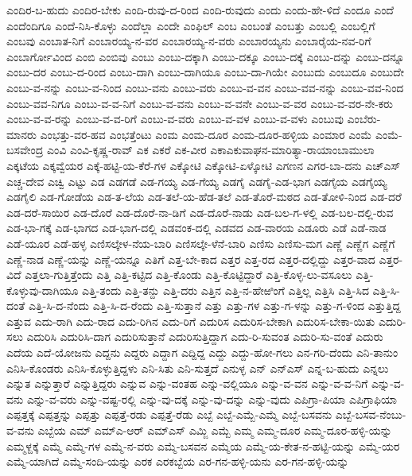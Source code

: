 ಎಂದಿರ-ಬ-ಹುದು
ಎಂದಿರ-ಬೇಕು
ಎಂದಿ-ರುವು-ದ-ರಿಂದ
ಎಂದಿ-ರುವುದು
ಎಂದು
ಎಂದು-ಹೇ-ಳಿದೆ
ಎಂದೂ
ಎಂದೆ
ಎಂದೆಂದಿಗೂ
ಎಂದೆ-ನಿಸಿ-ಕೊಳ್ಳು
ಎಂದೆಲ್ಲಾ
ಎಂದೇ
ಎಂಫಿಲ್
ಎಂಬ
ಎಂಬಂತೆ
ಎಂಬತ್ತು
ಎಂಬಲ್ಲಿ
ಎಂಬಲ್ಲಿಗೆ
ಎಂಬವು
ಎಂಬಾತ-ನಿಗೆ
ಎಂಬಾರಯ್ಯ-ನ-ವರ
ಎಂಬಾರಯ್ಯ-ನ-ವರು
ಎಂಬಾರಯ್ಯನು
ಎಂಬಾರೈಯ-ನವ-ರಿಗೆ
ಎಂಬಾರ್ಗೋವಿಂದ
ಎಂಬಿ
ಎಂಬಿವು
ಎಂಬು
ಎಂಬು-ದಕ್ಕಾಗಿ
ಎಂಬು-ದಕ್ಕೂ
ಎಂಬು-ದಕ್ಕೆ
ಎಂಬು-ದನ್ನು
ಎಂಬು-ದನ್ನೂ
ಎಂಬು-ದರ
ಎಂಬು-ದ-ರಿಂದ
ಎಂಬು-ದಾಗಿ
ಎಂಬು-ದಾಗಿಯೂ
ಎಂಬು-ದಾ-ಗಿಯೇ
ಎಂಬುದು
ಎಂಬುದೂ
ಎಂಬುದೇ
ಎಂಬು-ವ-ನನ್ನು
ಎಂಬು-ವ-ನಿಂದ
ಎಂಬು-ವನು
ಎಂಬು-ವರು
ಎಂಬು-ವ-ವನ
ಎಂಬು-ವವ-ನನ್ನು
ಎಂಬು-ವವ-ನಿಂದ
ಎಂಬು-ವವ-ನಿಗೂ
ಎಂಬು-ವ-ವ-ನಿಗೆ
ಎಂಬು-ವ-ವನು
ಎಂಬು-ವ-ವನೇ
ಎಂಬು-ವ-ವರ
ಎಂಬು-ವ-ವರ-ನೇ-ಕರು
ಎಂಬು-ವ-ವ-ರನ್ನು
ಎಂಬು-ವ-ವ-ರಿಗೆ
ಎಂಬು-ವ-ವರು
ಎಂಬು-ವ-ವಳ
ಎಂಬು-ವ-ವಳು
ಎಂಬುವು
ಎಂಬೆರು-ಮಾನರು
ಎಂಭತ್ತು-ವರ-ಹವ
ಎಂಭತ್ತೆಂಟು
ಎಂಮ
ಎಂಮ-ದೂರ
ಎಂಮ-ದೂರ-ಹಳ್ಳಿಯ
ಎಂಮಾರ
ಎಂಮೆ
ಎಂಮೆ-ಬಸವೇಂದ್ರ
ಎಂವಿ
ಎಂವಿ-ಕೃಷ್ಣ-ರಾವ್
ಎಕ
ಎಕರೆ
ಎಕ-ವೀರ
ಎಕಾಎಕುವಾಘನ-ಮಾರಿತ್ಯಾ-ರಾಯಾಂಬಾಮುಲಾ
ಎಕ್ಕಟೆಯ
ಎಕ್ಕವ್ವೆಯರ
ಎಕ್ಕೆ-ಹಟ್ಟಿ-ಯ-ಕೆರೆ-ಗಳ
ಎಕ್ಕೋಟಿ
ಎಕ್ಕೋಟಿ-ಏಳ್ಕೋಟಿ
ಎಗಣನ
ಎಗರ-ಬಾ-ದನು
ಎಚ್ಎಸ್
ಎಚ್ಚ-ದೇವ
ಎಚ್ವಿ
ಎಟ್ಟು
ಎಡ
ಎಡಗಡೆ
ಎಡ-ಗಯ್ಯ
ಎಡ-ಗೆಯ್ಯ
ಎಡಗೈ
ಎಡಗೈ-ಎಡ-ಭಾಗ
ಎಡಗೈಯ
ಎಡಗೈಯ್ಯ
ಎಡಗೈಲಿ
ಎಡ-ಗೋಡೆಯ
ಎಡ-ತ-ಲೆಯ
ಎಡ-ತಲೆ-ಯ-ಹೆಡ-ತಲೆ
ಎಡ-ತೊರೆ-ಮಠದ
ಎಡ-ತೋಳಿ-ನಿಂದ
ಎಡ-ದರೆ
ಎಡ-ದರೆ-ಸಾಯಿರ
ಎಡ-ದೊರೆ
ಎಡ-ದೊರೆ-ನಾ-ಡಿಗೆ
ಎಡ-ದೊರೆ-ನಾಡು
ಎಡ-ಬಲ-ಗ-ಳಲ್ಲಿ
ಎಡ-ಬಲ-ದಲ್ಲಿ-ರುವ
ಎಡ-ಭಾ-ಗಕ್ಕೆ
ಎಡ-ಭಾಗದ
ಎಡ-ಭಾಗ-ದಲ್ಲಿ
ಎಡವಂಕ-ದಲ್ಲಿ
ಎಡವದ
ಎಡ-ವಾರಯ
ಎಡೂರು
ಎಡೆ
ಎಡೆ-ನಾಡ
ಎಡೆ-ಯೂರ
ಎಡೆ-ಹಳ್ಳ
ಎಣಿಸಲ್ಕೇಳ-ನೆಯ-ಬಾರಿ
ಎಣಿಸಲ್ಕೇ-ಳೆನೆ-ಬಾರಿ
ಎಣಿಸು
ಎಣಿಸು-ಮಗ
ಎಣ್ಣೆ
ಎಣ್ಣೆಗ
ಎಣ್ಣೆಗೆ
ಎಣ್ಣೆ-ನಾಡ
ಎಣ್ಣೆ-ಯನ್ನು
ಎಣ್ಣೆ-ಯನ್ನೂ
ಎತಿಗೆ
ಎತ್ತ-ಬೇ-ಕಾದ
ಎತ್ತರ
ಎತ್ತ-ರದ
ಎತ್ತರ-ದಲ್ಲಿದ್ದು
ಎತ್ತರ-ವಾದ
ಎತ್ತರ-ವಿದೆ
ಎತ್ತಲಾ-ಗುತ್ತಿತ್ತೆಂದು
ಎತ್ತಿ
ಎತ್ತಿ-ಕಟ್ಟಿದ
ಎತ್ತಿ-ಕೊಂಡು
ಎತ್ತಿ-ಕೊಟ್ಟಿದ್ದಾರೆ
ಎತ್ತಿ-ಕೊಳ್ಳ-ಲು-ವಸೂಲು
ಎತ್ತಿ-ಕೊಳ್ಳುವು-ದಾಗಿಯೂ
ಎತ್ತಿ-ತಂದು
ಎತ್ತಿ-ತನ್ದು
ಎತ್ತಿ-ದರು
ಎತ್ತಿನ
ಎತ್ತಿ-ನ-ಹೇಱಿಂಗೆ
ಎತ್ತಿಲ್ಲ
ಎತ್ತಿಸಿ
ಎತ್ತಿ-ಸಿದ
ಎತ್ತಿ-ಸಿ-ದಂತೆ
ಎತ್ತಿ-ಸಿ-ದ-ನೆಂದು
ಎತ್ತಿ-ಸಿ-ದ-ರೆಂದು
ಎತ್ತಿ-ಸುತ್ತಾನೆ
ಎತ್ತು
ಎತ್ತು-ಗಳ
ಎತ್ತು-ಗ-ಳನ್ನು
ಎತ್ತು-ಗ-ಳಿಂದ
ಎತ್ತುತ್ತಿದ್ದ
ಎತ್ತುವ
ಎದು-ರಾಗಿ
ಎದು-ರಾದ
ಎದು-ರಿಗಿನ
ಎದು-ರಿಗೆ
ಎದುರಿಸ
ಎದುರಿಸ-ಬೇಕಾಗಿ
ಎದುರಿಸ-ಬೇಕಾ-ಯಿತು
ಎದುರಿ-ಸಲು
ಎದುರಿಸಿ
ಎದುರಿಸಿ-ದಾಗ
ಎದುರಿಸುತ್ತಾನೆ
ಎದುರಿಸುತ್ತಿದ್ದಾಗ
ಎದು-ರಿ-ಸುವಂತ
ಎದುರಿ-ಸು-ವಂತೆ
ಎದುರು
ಎದೆಯ
ಎದೆ-ಯೋಜನು
ಎದ್ದನು
ಎದ್ದರು
ಎದ್ದಾಗ
ಎದ್ದಿದ್ದ
ಎದ್ದು
ಎದ್ದು-ಹೋ-ಗಲು
ಎನ-ಗರಿ-ದೆಂದು
ಎನಿ-ತಾನುಂ
ಎನಿಸಿ-ಕೊಂಡರು
ಎನಿಸಿ-ಕೊಳ್ಳುತ್ತಿದ್ದಳು
ಎನಿ-ಸಿತು
ಎನಿ-ಸುತ್ತದೆ
ಎನುಳ್ಳ
ಎನ್
ಎನ್ಎಸ್
ಎನ್ನ-ಬ-ಹುದು
ಎನ್ನಲು
ಎನ್ನುತ
ಎನ್ನುತ್ತಾರೆ
ಎನ್ನುತ್ತಿದ್ದರು
ಎನ್ನುವ
ಎನ್ನು-ವಂತಹ
ಎನ್ನು-ವಲ್ಲಿಯೂ
ಎನ್ನು-ವ-ವನ
ಎನ್ನು-ವ-ವ-ನಿಗೆ
ಎನ್ನು-ವ-ವನು
ಎನ್ನು-ವ-ವರು
ಎನ್ನು-ವಷ್ಟ-ರಲ್ಲಿ
ಎನ್ನು-ವು-ದಕ್ಕೆ
ಎನ್ನು-ವು-ದನ್ನು
ಎನ್ನು-ವುದು
ಎಪಿಗ್ರಾ-ಪಿಯಾ
ಎಪಿಗ್ರಾಫಿಯಾ
ಎಪ್ಪತ್ತಕ್ಕೆ
ಎಪ್ಪತ್ತನ್ನು
ಎಪ್ಪತ್ತು
ಎಪ್ಪತ್ತೆ-ರಡು
ಎಪ್ಪತ್ತೆ-ರೆಡು
ಎಬ್ಬೆ
ಎಬ್ಬೆ-ಎಮ್ಬೆ-ಎಮ್ಮೆ
ಎಬ್ಬೆ-ಬಸವನು
ಎಬ್ಬೆ-ಬಸವ-ನೆಂಬು-ವ-ವನು
ಎಬ್ಬೆಯ
ಎಮ್
ಎಮ್ಎ-ಆರ್
ಎಮ್ಎಸ್
ಎಮ್ಜಿ
ಎಮ್ಬೆ
ಎಮ್ಮ
ಎಮ್ಮ-ದೂರ
ಎಮ್ಮ-ದೂರ-ಹಳ್ಳಿ-ಯನ್ನು
ಎಮ್ಮಳ್ದಕ್ಕೆ
ಎಮ್ಮೆ
ಎಮ್ಮೆ-ಗಳ
ಎಮ್ಮೆ-ನ-ವರು
ಎಮ್ಮೆ-ಬಸವನ
ಎಮ್ಮೆಯ
ಎಮ್ಮೆ-ಯ-ಕೇತ-ನ-ಹಟ್ಟಿ-ಯನ್ನು
ಎಮ್ಮೆ-ಯರ
ಎಮ್ಮೆ-ಯಾಗಿದೆ
ಎಮ್ಮೆ-ಸಂದಿ-ಯನ್ನು
ಎರಕ
ಎರಕಬ್ಬೆಯ
ಎರ-ಗನ-ಹಳ್ಳಿ-ಯನು
ಎರ-ಗನ-ಹಳ್ಳಿ-ಯನ್ನು
